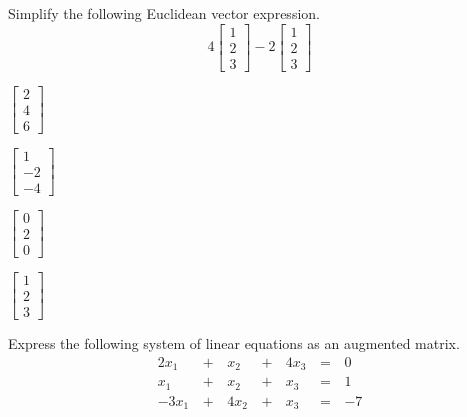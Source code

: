 \documentclass{article}
\begin{document}
\begin{readinessAssuranceTest}
\setcounter{enumi}{20}
\item Simplify the following Euclidean vector expression.
  \[
  4
  \begin{bmatrix}
    1 \\ 2 \\ 3
  \end{bmatrix}-
  2
  \begin{bmatrix}
    1 \\ 2 \\ 3
  \end{bmatrix}
  \]

\begin{multicols}{4}
\begin{readinessAssuranceTestChoices}
\item \(
        \begin{bmatrix}
          2 \\ 4 \\ 6
        \end{bmatrix}
      \) %
\item \(
        \begin{bmatrix}
          1 \\ -2 \\ -4
        \end{bmatrix}
      \)
\item \(
        \begin{bmatrix}
          0 \\ 2 \\ 0
        \end{bmatrix}
      \)
\item \(
        \begin{bmatrix}
          1 \\ 2 \\ 3
        \end{bmatrix}
      \)
\end{readinessAssuranceTestChoices}
\end{multicols}

\item Express the following system of linear equations as an augmented matrix.
\begin{alignat*}{4}
  2x_1 &\,+\,& x_2 &\,+\,& 4x_3 &\,=\,& 0 \\
   x_1 &\,+\,& x_2 &\,+\,&  x_3 &\,=\,& 1 \\
 -3x_1 &\,+\,& 4x_2 &\,+\,& x_3 &\,=\,& -7 \\
\end{alignat*}


\end{readinessAssuranceTest}
\end{document}
